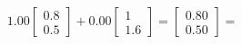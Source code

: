 \documentclass[preview]{standalone}
\begin{document}
\begin{align*}
1.00 \begin{bmatrix} 0.8 \\ 0.5 \end{bmatrix} + 0.00 \begin{bmatrix} 1 \\ 1.6 \end{bmatrix} = \begin{bmatrix} 0.80 \\ 0.50 \end{bmatrix} =
\end{align*}
\end{document}
